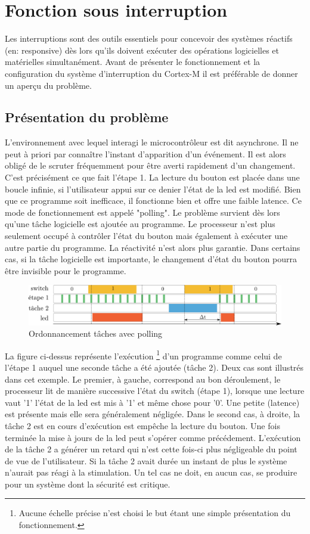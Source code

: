 \documentclass[a4paper]{article}
\begin{document}
	
	\newpage
	
	
	\section{Fonction sous interruption}
	Les interruptions sont des outils essentiels pour concevoir des systèmes réactifs (en: responsive)  dès lors qu'ils doivent exécuter des opérations logicielles et matérielles simultanément. Avant de présenter le fonctionnement et la configuration du système d'interruption du Cortex-M il est préférable de donner un aperçu du problème.
	\subsection{Présentation du problème}
	L'environnement avec lequel interagi le microcontrôleur est dit asynchrone. Il ne peut à priori par connaître l'instant d'apparition d'un événement. Il est alors obligé de le scruter fréquemment pour être averti rapidement d'un changement. C'est précisément ce que fait l'étape 1. La lecture du bouton est placée dans une boucle infinie, si l'utilisateur appui sur ce denier l'état de la led est modifié. Bien que ce programme soit inefficace, il fonctionne bien et offre une faible latence. Ce mode de fonctionnement est appelé "polling". Le problème survient dès lors qu'une tâche logicielle est ajoutée au programme. Le processeur n'est plus seulement occupé à contrôler l'état du bouton mais également à exécuter une autre partie du programme. La réactivité n'est alors plus garantie. Dans certains cas, si la tâche logicielle est importante, le changement d'état du bouton pourra être invisible pour le programme.
	\begin{figure}[H]
		\centering
		\includegraphics[width=\linewidth]{polling_task}
		\caption{Ordonnancement tâches avec polling}
	\end{figure}
	La figure ci-dessus représente l'exécution \footnote{Aucune échelle précise n'est choisi le but étant une simple présentation du fonctionnement.} d'un programme comme celui de l'étape 1 auquel une seconde tâche a été ajoutée (tâche 2).  Deux cas sont illustrés dans cet exemple. Le premier, à gauche, correspond au bon déroulement, le processeur lit de manière successive l'état du switch (étape 1), lorsque une lecture vaut '1' l'état de la led est mis à '1' et même chose pour '0'. Une petite (latence) est présente mais elle sera généralement négligée. Dans le second cas, à droite, la tâche 2 est en cours d'exécution est empêche la lecture du bouton. Une fois terminée la mise à jours de la led peut s'opérer comme précédement. L'exécution de la tâche 2 a générer un retard qui n'est cette fois-ci plus négligeable du point de vue de l'utilisateur. Si la tâche 2 avait durée un instant de plus le système n'aurait pas réagi à la stimulation. Un tel cas ne doit, en aucun cas, se produire pour un système dont la sécurité est critique.\\
\end{document}

